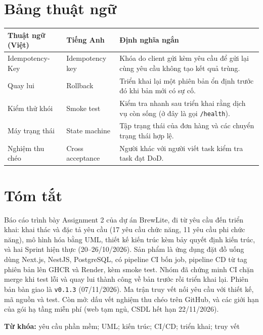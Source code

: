 \documentclass[a4paper]{article}
\begin{document}
\section*{Bảng thuật ngữ}
\begin{longtable}{@{}p{3.3cm}p{3.3cm}p{6.4cm}@{}}
\toprule
\textbf{Thuật ngữ (Việt)} & \textbf{Tiếng Anh} & \textbf{Định nghĩa ngắn} \\ \midrule \endhead
Idempotency-Key & Idempotency key & Khóa do client gửi kèm yêu cầu để gửi lại cùng yêu cầu không tạo kết quả trùng. \\
Quay lui & Rollback & Triển khai lại một phiên bản ổn định trước đó khi bản mới có sự cố. \\
Kiểm thử khói & Smoke test & Kiểm tra nhanh sau triển khai rằng dịch vụ còn sống (ở đây là gọi \texttt{/health}). \\
Máy trạng thái & State machine & Tập trạng thái của đơn hàng và các chuyển trạng thái hợp lệ. \\
Nghiệm thu chéo & Cross acceptance & Người khác với người viết task kiểm tra task đạt DoD. \\
\bottomrule
\end{longtable}

\clearpage
\section*{Tóm tắt}
Báo cáo trình bày Assignment 2 của dự án BrewLite, đi từ yêu cầu đến triển khai: khai thác và đặc tả yêu cầu (17 yêu cầu chức năng, 11 yêu cầu phi chức năng), mô hình hóa bằng UML, thiết kế kiến trúc kèm bảy quyết định kiến trúc, và hai Sprint hiện thực (20--26/10/2026). Sản phẩm là ứng dụng đặt đồ uống dùng Next.js, NestJS, PostgreSQL, có pipeline CI bốn job, pipeline CD từ tag phiên bản lên GHCR và Render, kèm smoke test. Nhóm đã chứng minh CI chặn merge khi test lỗi và quay lui thành công về bản trước rồi triển khai lại. Phiên bản bàn giao là \texttt{v0.1.3} (07/11/2026). Ma trận truy vết nối yêu cầu với thiết kế, mã nguồn và test. Còn mở: dấu vết nghiệm thu chéo trên GitHub, và các giới hạn của gói hạ tầng miễn phí (web tạm ngủ, CSDL hết hạn 22/11/2026).

\vspace{6pt}
\noindent\textbf{Từ khóa:} yêu cầu phần mềm; UML; kiến trúc; CI/CD; triển khai; truy vết

\clearpage


\end{document}
